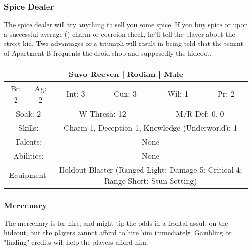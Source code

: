 \documentclass[letterpaper]{article}
\begin{document}
\subsubsection{Spice Dealer}

The spice dealer will try anything to sell you some spice. If you buy spice or upon a successful average (\difficulty) charm or coercion check, he'll tell the player about the street kid. Two advantages \advantage\advantage or a triumph \triumph will result in being told that the tenant of Apartment B frequents the droid shop and supposedly the hideout.

\begin{center}
\begin{tabular}{| c c c c c c |}
    \hline
    \multicolumn{6}{|c|}{Suvo Reeven | Rodian | Male} \\
    \hline
    Br: 2 & Ag: 2 & Int: 3 & Cun: 3 & Wil: 1 & Pr: 2 \\[2mm]
    \multicolumn{2}{|c}{Soak: 2} & \multicolumn{2}{c}{W Thresh: 12} & \multicolumn{2}{c|}{M/R Def: 0, 0} \\
    \hline
    \multicolumn{2}{|c}{Skills:} & \multicolumn{4}{p{5cm}|}{Charm 1, Deception 1, Knowledge (Underworld): 1} \\
    \multicolumn{2}{|c}{Talents:} & \multicolumn{4}{p{5cm}|}{None} \\
    \multicolumn{2}{|c}{Abilities:} & \multicolumn{4}{p{5cm}|}{None} \\
    \multicolumn{2}{|c}{Equipment:} & \multicolumn{4}{p{5cm}|}{Holdout Blaster (Ranged Light; Damage 5; Critical 4; Range Short; Stun Setting)} \\
    \hline
\end{tabular}
\end{center}

\subsubsection{Mercenary}

The mercenary is for hire, and might tip the odds in a frontal assult on the hideout, but the players cannot afford to hire him immediately. Gambling or "finding" credits will help the players afford him.
\end{document}
